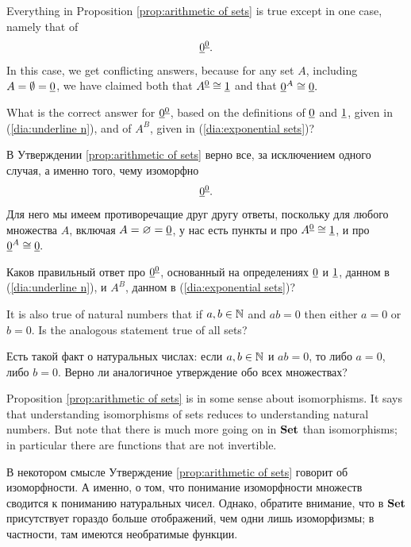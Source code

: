 \documentclass[CT4S-EN-RU]{subfiles}
\begin{document}
\begin{exerciseENG}\label{exc:0 to the 0}
Everything in Proposition \ref{prop:arithmetic of sets} is true except in one case, namely that of $$\underline{0}^{\underline{0}}.$$ In this case, we get conflicting answers, because for any set $A$, including $A=\emptyset=\underline{0}$, we have claimed both that $A^{\underline{0}}\cong\underline{1}$ and that $\underline{0}^A\cong\underline{0}.$ 

What is the correct answer for $\underline{0}^{\underline{0}}$, based on the definitions of $\underline{0}$ and $\underline{1}$, given in (\ref{dia:underline n}), and of $A^B$, given in (\ref{dia:exponential sets})?
\end{exerciseENG}

\begin{exerciseRUS}\label{exc:0 to the 0}
В Утверждении \ref{prop:arithmetic of sets} верно все, за исключением одного случая, а именно того, чему изоморфно $$\underline{0}^{\underline{0}}.$$ Для него мы имеем противоречащие друг другу ответы, поскольку для любого множества $A$, включая $A=\varnothing=\underline{0}$, у нас есть пункты и про $A^{\underline{0}}\cong\underline{1}$, и про $\underline{0}^A\cong\underline{0}.$ 

Каков правильный ответ про $\underline{0}^{\underline{0}}$, основанный на определениях $\underline{0}$ и $\underline{1}$, данном в (\ref{dia:underline n}), и $A^B$, данном в (\ref{dia:exponential sets})?
\end{exerciseRUS}

\begin{exerciseENG}
It is also true of natural numbers that if $a,b\in{\mathbb N}$ and $ab=0$ then either $a=0$ or $b=0$. Is the analogous statement true of all sets?
\end{exerciseENG}

\begin{exerciseRUS}
Есть такой факт о натуральных числах: если $a,b\in{\mathbb N}$ и $ab=0$, то либо $a=0$, либо $b=0$. Верно ли аналогичное утверждение обо всех множествах?
\end{exerciseRUS}

\begin{blockENG}
Proposition \ref{prop:arithmetic of sets} is in some sense about isomorphisms. It says that understanding isomorphisms of sets reduces to understanding natural numbers. But note that there is much more going on in ${\bf Set}$ than isomorphisms; in particular there are functions that are not invertible.
\end{blockENG}

\begin{blockRUS}
В некотором смысле Утверждение \ref{prop:arithmetic of sets} говорит об изоморфности. А именно, о том, что понимание изоморфности множеств сводится к пониманию натуральных чисел. Однако, обратите внимание, что в ${\bf Set}$ присутствует гораздо больше отображений, чем одни лишь изоморфизмы; в частности, там имеются необратимые функции.
\end{blockRUS}
\end{document}
